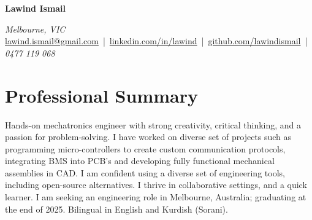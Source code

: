 \documentclass[11pt,a4paper]{article}
\begin{document}
\begin{center}
    {\Huge \bfseries Lawind Ismail}
    \vspace{5pt}
\end{center}

\begin{center}
    \textit{Melbourne, VIC} \\
    \href{mailto:lawind.ismail@gmail.com}{lawind.ismail@gmail.com} \,|\,
    \href{https://www.linkedin.com/in/lawind}{linkedin.com/in/lawind} \,|\,
    \href{https://github.com/lawindismail}{github.com/lawindismail} \,|\,
    \textit{0477 119 068}
\end{center}

\section{Professional Summary}
\justifying
Hands-on mechatronics engineer with strong creativity, critical thinking, and a passion for problem-solving. I have worked on diverse set of projects such as programming micro-controllers to create custom communication protocols, integrating BMS into PCB's and developing fully functional mechanical assemblies in CAD. I am confident using a diverse set of engineering tools, including open-source alternatives. I thrive in collaborative settings, and a quick learner. I am seeking an engineering role in Melbourne, Australia; graduating at the end of 2025. Bilingual in English and Kurdish (Sorani).

\end{document}
